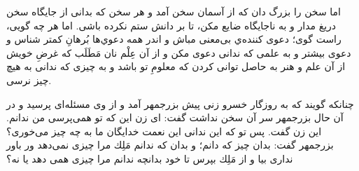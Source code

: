 اما سخن را بزرگ دان كه از آسمان سخن آمد و هر سخن كه بدانى از جايگاه سخن دريغ مدار و به ناجايگاه ضايع مكن، تا بر دانش ستم نكرده باشى. اما هر چه گويى، راست گوى؛ دعوى كننده‌ي بى‌معنى مباش و اندر همه دعوي‌ها بُرهانِ كمتر شناس و دعوى بيشتر و به علمى كه ندانى دعوى مكن و از آن عِلْم نان مَطَلَب كه غرضِ خويش از آن علم و هنر به حاصل توانى كردن كه معلومِ تو باشد و به چيزى كه ندانى به هيچ‌ چيز نرسى.


 چنانكه گويند كه به روزگار خسرو زنى پيش بزرجمهر آمد و از وى مسئله‌اى پرسيد و در آن حال بزرجمهر سر آن سخن نداشت گفت: اى زن اين كه تو همى‌پرسى من ندانم. اين زن گفت. پس تو كه اين ندانى اين نعمت خدايگان ما به چه چيز مى‌خورى‌؟ بزرجمهر گفت: بدان چيز كه دانم؛ و بدان كه ندانم مَلِك مرا چيزى نمى‌دهد ور باور ندارى بيا و از مَلِك بپرس تا خود بدانچه ندانم مرا چيزى همى دهد يا نه‌؟


